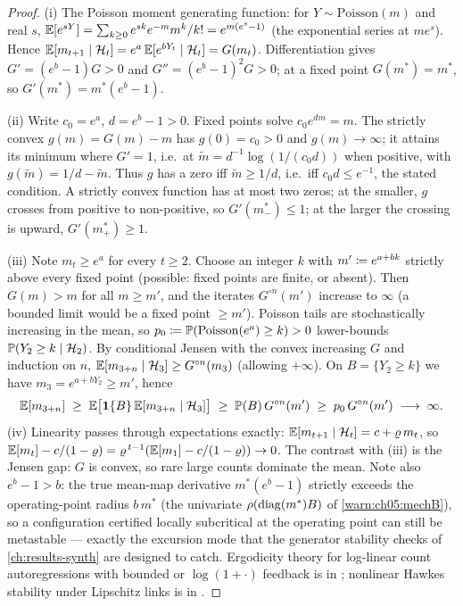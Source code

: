 \begin{proof}
(i) The Poisson moment generating function: for $Y \sim \mathrm{Poisson}(m)$ and real $s$, $\mathbb{E}[e^{sY}]
= \sum_{k \ge 0} e^{sk} e^{-m} m^k / k! = e^{m(e^s - 1)}$ (the exponential series at $m e^s$). Hence
$\mathbb{E}[m_{t+1} \mid \mathcal{H}_t] = e^a\, \mathbb{E}[e^{bY_t} \mid \mathcal{H}_t] = G(m_t)$. Differentiation gives $G' = (e^b
- 1) G > 0$ and $G'' = (e^b-1)^2 G > 0$; at a fixed point $G(m^*) = m^*$, so $G'(m^*) = m^*(e^b - 1)$.

(ii) Write $c_0 = e^a$, $d = e^b - 1 > 0$. Fixed points solve $c_0 e^{dm} = m$. The strictly convex
$g(m) = G(m) - m$ has $g(0) = c_0 > 0$ and $g(m) \to \infty$; it attains its minimum where $G' = 1$,
i.e.\ at $\tilde m = d^{-1}\log(1/(c_0 d))$ when positive, with $g(\tilde m) = 1/d - \tilde m$. Thus
$g$ has a zero iff $\tilde m \ge 1/d$, i.e.\ iff $c_0 d \le e^{-1}$, the stated condition. A strictly
convex function has at most two zeros; at the smaller, $g$ crosses from positive to non-positive, so
$G'(m^*_-) \le 1$; at the larger the crossing is upward, $G'(m^*_+) \ge 1$.

(iii) Note $m_t \ge e^a$ for every $t \ge 2$. Choose an integer $k$ with $m' \coloneqq e^{a + bk}$
strictly above every fixed point (possible: fixed points are finite, or absent). Then $G(m) > m$ for
all $m \ge m'$, and the iterates $G^{\circ n}(m')$ increase to $\infty$ (a bounded limit would be a
fixed point $\ge m'$). Poisson tails are stochastically increasing in the mean, so $p_0 \coloneqq
\mathbb{P}(\mathrm{Poisson}(e^a) \ge k) > 0$ lower-bounds $\mathbb{P}(Y_2 \ge k \mid \mathcal{H}_2)$. By conditional
Jensen with the convex increasing $G$ and induction on $n$, $\mathbb{E}[m_{3+n} \mid \mathcal{H}_3] \ge G^{\circ
n}(m_3)$ (allowing $+\infty$). On $B = \{Y_2 \ge k\}$ we have $m_3 = e^{a + bY_2} \ge m'$, hence
\[
\mathbb{E}[m_{3+n}] \;\ge\; \mathbb{E}\big[\mathbf{1}\{B\}\, \mathbb{E}[m_{3+n} \mid \mathcal{H}_3]\big]
\;\ge\; \mathbb{P}(B)\, G^{\circ n}(m') \;\ge\; p_0\, G^{\circ n}(m')
\;\longrightarrow\; \infty .
\]
(iv) Linearity passes through expectations exactly: $\mathbb{E}[m_{t+1} \mid \mathcal{H}_t] = c + \varrho\, m_t$, so
$\mathbb{E}[m_t] - c/(1-\varrho) = \varrho^{\,t-1}(\mathbb{E}[m_1] - c/(1-\varrho)) \to 0$. The contrast with (iii) is
the Jensen gap: $G$ is convex, so rare large counts dominate the mean. Note also $e^b - 1 > b$: the
true mean-map derivative $m^*(e^b - 1)$ strictly exceeds the operating-point radius $b\,m^*$ (the
univariate $\rho\!\left(\operatorname{diag}(m^*)B\right)$ of \cref{warn:ch05:mechB}), so a configuration certified locally
subcritical at the operating point can still be metastable --- exactly the excursion mode that the
generator stability checks of \cref{ch:results-synth} are designed to catch.
Ergodicity theory for log-linear count autoregressions with bounded or
$\log(1+\cdot)$ feedback is in \citet{fokianos2009,fokianos2011}; nonlinear Hawkes stability under
Lipschitz links is in \citet{bremaud1996}.
\end{proof}
